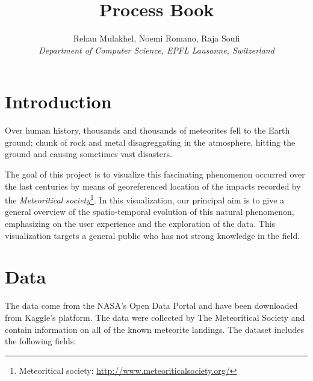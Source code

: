 \documentclass[10pt,conference,compsocconf]{IEEEtran}
\begin{document}
\title{Process Book}

\author{
  Rehan Mulakhel, Noemi Romano, Raja Soufi\\
  \textit{Department of Computer Science, EPFL Lausanne, Switzerland}
}

\maketitle

\section{Introduction}

Over human history, thousands and thousands of meteorites fell to the Earth ground; chunk of rock and metal disagreggating in the atmosphere, hitting the ground and causing sometimes vast disasters. 

The goal of this project is to visualize this fascinating phenomenon occurred over the last centuries by means of georeferenced location of the impacts recorded by the \textit{Meteoritical society}\footnote{Meteoritical society: \href{http://www.meteoriticalsociety.org/}{http://www.meteoriticalsociety.org/}}. In this visualization, our principal aim is to give a general overview of the spatio-temporal evolution of this natural phenomenon, emphasizing on the user experience and the exploration of the data. This visualization targets a general public who has not strong knowledge in the field. 


\section{Data}
\label{sec:data}
The data come from the NASA’s Open Data Portal and have been downloaded from Kaggle’s platform. The data were collected by The Meteoritical Society and contain information on all of the known meteorite landings. The dataset includes the following fields:
\end{document}
